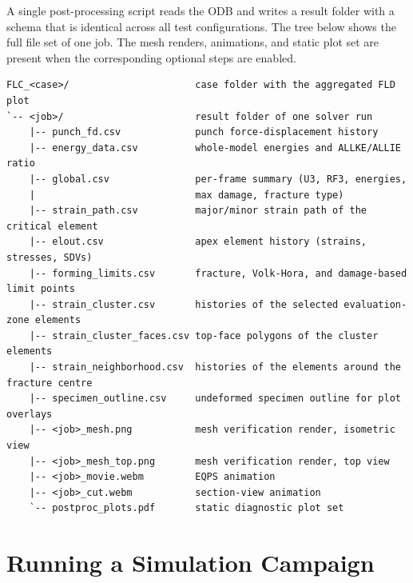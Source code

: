A single post-processing script reads the ODB and writes a result folder with
a schema that is identical across all test configurations. The tree below
shows the full file set of one job. The mesh renders, animations, and static
plot set are present when the corresponding optional steps are enabled.

\begin{lstlisting}[frame=lines,basicstyle=\ttfamily\scriptsize]
FLC_<case>/                      case folder with the aggregated FLD plot
`-- <job>/                       result folder of one solver run
    |-- punch_fd.csv             punch force-displacement history
    |-- energy_data.csv          whole-model energies and ALLKE/ALLIE ratio
    |-- global.csv               per-frame summary (U3, RF3, energies,
    |                            max damage, fracture type)
    |-- strain_path.csv          major/minor strain path of the critical element
    |-- elout.csv                apex element history (strains, stresses, SDVs)
    |-- forming_limits.csv       fracture, Volk-Hora, and damage-based limit points
    |-- strain_cluster.csv       histories of the selected evaluation-zone elements
    |-- strain_cluster_faces.csv top-face polygons of the cluster elements
    |-- strain_neighborhood.csv  histories of the elements around the fracture centre
    |-- specimen_outline.csv     undeformed specimen outline for plot overlays
    |-- <job>_mesh.png           mesh verification render, isometric view
    |-- <job>_mesh_top.png       mesh verification render, top view
    |-- <job>_movie.webm         EQPS animation
    |-- <job>_cut.webm           section-view animation
    `-- postproc_plots.pdf       static diagnostic plot set
\end{lstlisting}

\section{Running a Simulation Campaign}

